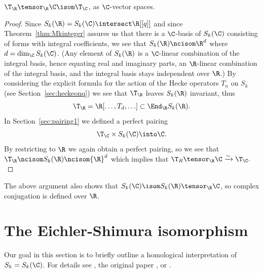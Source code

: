 \documentclass{report}
\begin{document}
\begin{proposition}
   $\T_{\R}\tensor_{\R}\C \isom \T_{\C}$, as $\C$-vector spaces.
\end{proposition}
\begin{proof}
Since $S_k(\R)=S_k(\C)\intersect\R[[q]]$ and since
Theorem~\ref{thm:Mkinteger} assures us that there is a $\C$-basis of
$S_k(\C)$ consisting of forms with integral coefficients,
we see that $S_k(\R)\ncisom \R^d$ where $d=\dim_{\C}S_k(\C)$.
(Any element of $S_k(\R)$ is a $\C$-linear combination
of the integral basis, hence equating real and imaginary
parts, an $\R$-linear combination of the integral basis,
and the integral basis stays independent over $\R$.)
By considering the explicit formula for the action
of the Hecke operators $T_n$ on $S_k$ (see Section~\ref{sec:heckeonq})
we see that $\T_{\R}$ leaves $S_k(\R)$ invariant, thus
$$\T_{\R}=\R[\ldots,T_d,\ldots]\subset \End_{\R}S_k(\R).$$
In Section~\ref{sec:pairing1} we defined a perfect pairing
$$\T_{\C}\times S_k(\C)\into \C.$$ By restricting
to $\R$ we again obtain a perfect pairing, so we see that
$\T_{\R}\ncisom S_k(\R) \ncisom {\R}^d$ which
implies that
$\T_R\tensor_{\R}\C \xrightarrow{\sim}\T_{\C}.$
\end{proof}

The above argument also shows that $S_k(\C)\isom S_k(\R)\tensor_{\R}
\C$, so complex conjugation is defined over $\R$.

\section{The Eichler-Shimura isomorphism}

Our goal in this section is to briefly outline a homological
interpretation of $S_k = S_k(\C)$. For details see
\cite[VI]{lang:modular}, the original paper \cite{shimura:surles}, or
\cite[VIII]{shimura:intro}.
\end{document}

